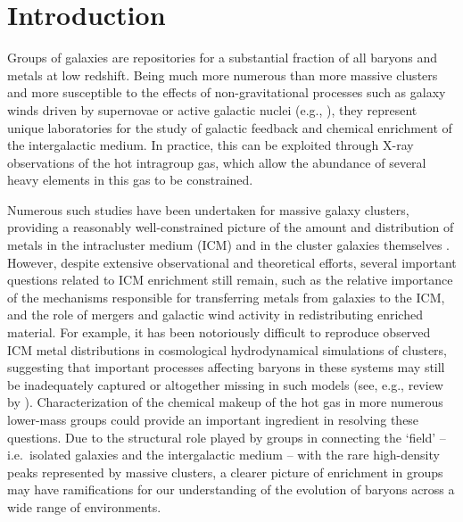 \documentclass[useAMS,usenatbib]{mn2e}
\begin{document}
\section{Introduction}

Groups of galaxies are repositories for a substantial fraction of all
baryons and metals at low redshift. Being much more numerous than more
massive clusters and more susceptible to the effects of
non-gravitational processes such as galaxy winds driven by supernovae
or active galactic nuclei (e.g., \citealt{hels00,borg04,rome06}), they
represent unique laboratories for the study of galactic feedback and
chemical enrichment of the intergalactic medium. In practice, this can
be exploited through X-ray observations of the hot intragroup gas,
which allow the abundance of several heavy elements in this gas to be
constrained.

Numerous such studies have been undertaken for massive galaxy
clusters, providing a reasonably well-constrained picture of the
amount and distribution of metals in the intracluster medium (ICM) and
in the cluster galaxies themselves \citep*{fino00, boeh04, degr04,
mouh06, bald07, lecc08}.  However, despite extensive observational and
theoretical efforts, several important questions related to ICM
enrichment still remain, such as the relative importance of the
mechanisms responsible for transferring metals from galaxies to the
ICM, and the role of mergers and galactic wind activity in
redistributing enriched material.  For example, it has been
notoriously difficult to reproduce observed ICM metal distributions in
cosmological hydrodynamical simulations of clusters, suggesting that
important processes affecting baryons in these systems may still be
inadequately captured or altogether missing in such models (see, e.g.,
review by \citealt{borg08b}). Characterization of the chemical makeup
of the hot gas in more numerous lower-mass groups could provide an
important ingredient in resolving these questions. Due to the
structural role played by groups in connecting the `field' -- i.e.\
isolated galaxies and the intergalactic medium -- with the rare
high-density peaks represented by massive clusters, a clearer picture
of enrichment in groups may have ramifications for our understanding
of the evolution of baryons across a wide range of environments.
\end{document}
